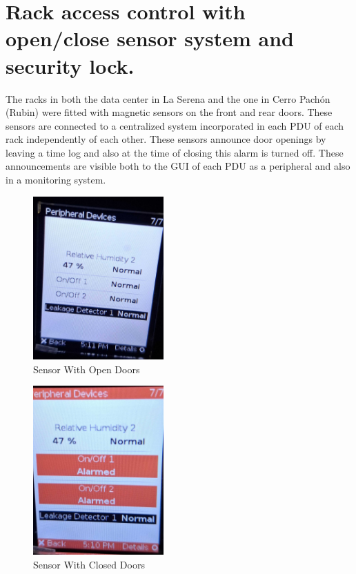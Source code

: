   \newpage

\section{Rack access control with open/close sensor system and security lock.}

The racks in both the data center in La Serena and the one in Cerro Pachón (Rubin) were fitted with magnetic sensors on the front and rear doors. These sensors are connected to a centralized system incorporated in each PDU of each rack independently of each other. These sensors announce door openings by leaving a time log and also at the time of closing this alarm is turned off. These announcements are visible both to the GUI of each PDU as a peripheral and also in a monitoring system.

\begin{figure}
    \includegraphics[width=5cm]{24.jpg}
    \centering
    \caption*{Sensor With Open Doors}
  \end{figure}
  \begin{figure}
    \includegraphics[width=5cm]{23.jpg}
    \centering
    \caption*{Sensor With Closed Doors}
  \end{figure}
